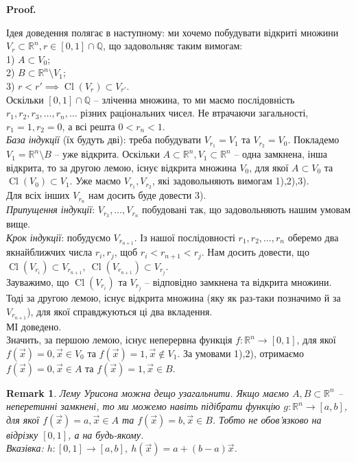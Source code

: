 \documentclass[a4paper, 10pt]{article}
\makeatletter
\def\qed{$\blacksquare$}
\theoremstyle{theoremdd}
\theoremstyle{theoremdd}
\theoremstyle{theoremdd}
\theoremstyle{theoremdd}
\theoremstyle{theoremdd}
\theoremstyle{theoremdd}
\theoremstyle{theoremdd}
\theoremstyle{theoremdd}
\theoremstyle{theoremdd}
\theoremstyle{theoremdd}
\theoremstyle{theoremdd}
\newtheorem{remark}[theorem]{Remark}
\theoremstyle{theoremdd}
\theoremstyle{theoremdd}
\theoremstyle{theoremdd}
\theoremstyle{theoremdd}
\renewenvironment{proof}[1][Proof.\\]{\par
\pushQED{\hfill \qed}%
\normalfont \topsep6\p@\@plus6\p@\relax
\trivlist
\item\relax
{\bfseries
#1\@addpunct{.}}\hspace\labelsep\ignorespaces
}{%
\popQED\endtrivlist\@endpefalse
}
\DeclareMathOperator{\Cl}{Cl}
\makeatother
\begin{document}
\begin{proof}
Ідея доведення полягає в наступному: ми хочемо побудувати відкриті множини $V_r \subset \mathbb{R}^n, r \in [0,1] \cap \mathbb{Q}$, що задовольняє таким вимогам:\\
1) $A \subset V_0$;\\
2) $B \subset \mathbb{R}^n \setminus V_1$;\\
3) $r < r' \implies \Cl(V_r) \subset V_{r'}$.\\
Оскільки $[0,1] \cap \mathbb{Q}$ -- зліченна множина, то ми маємо послідовність $r_1,r_2,r_3,\dots,r_n,\dots$ різних раціональних чисел. Не втрачаючи загальності, $r_1 = 1, r_2 = 0$, а всі решта $0 < r_n < 1$.\\
\textit{База індукції} (їх будуть дві): треба побудувати $V_{r_1} = V_1$ та $V_{r_2} = V_0$. Покладемо $V_1 = \mathbb{R}^n \setminus B$ -- уже відкрита. Оскільки $A \subset \mathbb{R}^n, V_1 \subset \mathbb{R}^n$ -- одна замкнена, інша відкрита, то за другою лемою, існує відкрита множина $V_0$, для якої $A \subset V_0$ та $\Cl(V_0) \subset V_1$. Уже маємо $V_{r_1},V_{r_2}$, які задовольняють вимогам 1),2),3).\\
Для всіх інших $V_{r_n}$ нам досить буде довести 3).\\
\textit{Припущення індукції}: $V_{r_3},\dots,V_{r_n}$ побудовані так, що задовольняють нашим умовам вище.\\
\textit{Крок індукції}: побудуємо $V_{r_{n+1}}$. Із нашої послідовності $r_1,r_2,\dots,r_n$ оберемо два якнайближчих числа $r_i,r_j$, щоб $r_i < r_{n+1} < r_j$. Нам досить довести, що $\Cl(V_{r_i}) \subset V_{r_{n+1}},\ \Cl(V_{r_{n+1}}) \subset V_{r_j}$.\\
Зауважимо, що $\Cl(V_{r_i})$ та $V_{r_j}$ -- відповідно замкнена та відкрита множини. Тоді за другою лемою, існує відкрита множина (яку як раз-таки позначимо й за $V_{r_{n+1}}$), для якої справджуються ці два вкладення. \\
МІ доведено.\\
Значить, за першою лемою, існує неперервна функція $f \colon \mathbb{R}^n \to [0,1]$, для якої $f(\vec{x}) = 0, \vec{x} \in V_0$ та $f(\vec{x}) = 1, \vec{x} \notin V_1$. За умовами 1),2), отримаємо $f(\vec{x}) = 0, \vec{x} \in A$ та $f(\vec{x}) = 1, \vec{x} \in B$.
\end{proof}

\begin{remark}
Лему Урисона можна дещо узагальнити. Якщо маємо $A,B \subset \mathbb{R}^n$ -- неперетинні замкнені, то ми можемо навіть підібрати функцію $g \colon \mathbb{R}^n \to [a,b]$, для якої $f(\vec{x}) = a, \vec{x} \in A$ та $f(\vec{x}) = b, \vec{x} \in B$. Тобто не обов'язково на відрізку $[0,1]$, а на будь-якому.\\
\textit{Вказівка: $h \colon [0,1] \to [a,b],\ h(\vec{x}) = a + (b-a)\vec{x}$.}
\end{remark}
\end{document}
